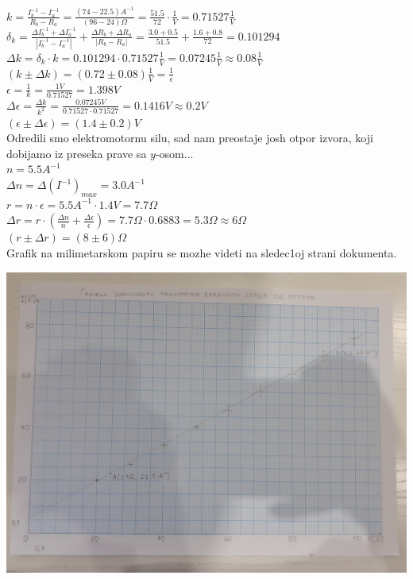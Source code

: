 \documentclass[11pt]{article}
\newcommand\D{\displaystyle}
\begin{document}
$k=\D\frac{I^{-1}_b - I^{-1}_a}{R_b - R_a} = \D\frac{(74-22.5)A^{-1}}{(96-24)\Omega} = \D\frac{51.5}{72}\cdot\frac{1}{V} = 0.71527\D\frac{1}{V}$\\[3mm]
$\delta_k = \D\frac{\Delta I^{-1}_b + \Delta I^{-1}_a}{|I^{-1}_b - I^{-1}_a|} + \D\frac{\Delta R_b + \Delta R_a}{|R_b - R_a|} = \D\frac{3.0+0.5}{51.5} + \D\frac{1.6+0.8}{72} = 0.101294$\\[8mm]
$\Delta k =\delta_k \cdot k = 0.101294\cdot 0.71527\D\frac{1}{V} = 0.07245\D\frac{1}{V} \approx 0.08\frac{1}{V}$\\
$(k \pm \Delta k) = (0.72 \pm 0.08)\D\frac{1}{V} = \D\frac{1}{\epsilon}$\\[5mm]

$\epsilon = \D\frac{1}{k} = \D\frac{1V}{0.71527}=1.398V$\\
$\Delta\epsilon = \D\frac{\Delta k}{k^2} = \D\frac{0.07245V}{0.71527\cdot 0.71527} = 0.1416V \approx 0.2V$\\[5mm]
$(\epsilon\pm\Delta\epsilon)=(1.4\pm0.2)V$\\

\newpage
Odredili smo elektromotornu silu, sad nam preostaje josh otpor izvora, koji dobijamo iz preseka prave sa $y$-osom...\\

$n=5.5A^{-1}$\\
$\Delta n=\Delta(I^{-1})_{max}=3.0A^{-1}$\\

$r=n\cdot\epsilon = 5.5A^{-1}\cdot 1.4V=7.7\Omega$\\
$\Delta r=r\cdot(\D\frac{\Delta n}{n}+\D\frac{\Delta\epsilon}{\epsilon})=7.7\Omega\cdot 0.6883 = 5.3\Omega \approx 6\Omega$\\

$(r\pm\Delta r)=(8\pm 6)\Omega$\\

Grafik na milimetarskom papiru se mozhe videti na sledec1oj strani dokumenta.

\includegraphics[angle=270,scale=0.16]{slika.jpg}
\end{document}
